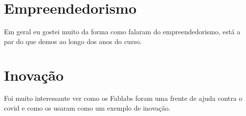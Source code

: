 
\section{Empreendedorismo}

Em geral eu gostei muito da forma como falaram do empreendedorismo, está a par do que demos ao longo dos anos do curso.

\section{Inovação}

Foi muito interessante ver como os Fablabs foram uma frente de ajuda contra o covid e como os usaram como um exemplo de inovação.

